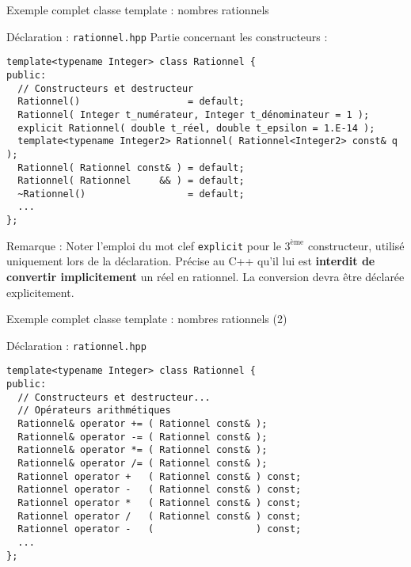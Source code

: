 \documentclass[compress,10pt,aspectratio=169]{beamer}
\begin{document}
\begin{frame}[fragile]{Exemple complet classe template : nombres rationnels}
  \scriptsize\vspace*{-3mm}

  \begin{block}{\small Déclaration : \texttt{rationnel.hpp}}
  Partie concernant les constructeurs :
\begin{verbatim}
template<typename Integer> class Rationnel {
public:
  // Constructeurs et destructeur
  Rationnel()                   = default;
  Rationnel( Integer t_numérateur, Integer t_dénominateur = 1 );
  explicit Rationnel( double t_réel, double t_epsilon = 1.E-14 );
  template<typename Integer2> Rationnel( Rationnel<Integer2> const& q );
  Rationnel( Rationnel const& ) = default;
  Rationnel( Rationnel     && ) = default;
  ~Rationnel()                  = default;
  ...
};
\end{verbatim}
\end{block}
\alert{Remarque} : Noter l'emploi du mot clef \texttt{explicit} pour le 
                   $3^{\mbox{ème}}$ constructeur, utilisé uniquement lors 
                   de la déclaration. Précise au C++ qu'il lui est 
                   \textbf{interdit de convertir implicitement} un réel en
                   rationnel. La conversion devra être déclarée explicitement.
\end{frame}

\begin{frame}[fragile]{Exemple complet classe template : nombres rationnels (2)}
\scriptsize
\begin{block}{\small Déclaration : \texttt{rationnel.hpp}}
\begin{verbatim}
template<typename Integer> class Rationnel {
public:
  // Constructeurs et destructeur... 
  // Opérateurs arithmétiques
  Rationnel& operator += ( Rationnel const& );
  Rationnel& operator -= ( Rationnel const& );
  Rationnel& operator *= ( Rationnel const& );
  Rationnel& operator /= ( Rationnel const& );
  Rationnel operator +   ( Rationnel const& ) const;
  Rationnel operator -   ( Rationnel const& ) const;
  Rationnel operator *   ( Rationnel const& ) const;
  Rationnel operator /   ( Rationnel const& ) const;
  Rationnel operator -   (                  ) const;
  ... 
};
\end{verbatim}
\end{block}
\end{frame}
\end{document}
